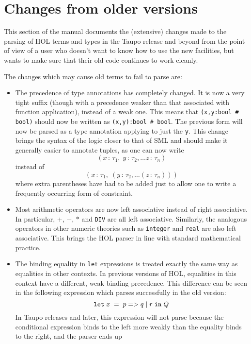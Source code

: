 \documentclass[12pt,fleqn,a4paper]{report}
\begin{document}
\section{Changes from older versions}

This section of the manual documents the (extensive) changes made to
the parsing of HOL terms and types in the Taupo release and beyond
from the point of view of a user who doesn't want to know how to use
the new facilities, but wants to make sure that their old code
continues to work cleanly.

The changes which may cause old terms to fail to parse are:
\begin{itemize}
\newcommand\condexp{\mbox{$p \; {\tt =>} \; q \; {\tt |} \; r$}}
\item The precedence of type annotations has completely changed.  It
  is now a very tight suffix (though with a precedence weaker than
  that associated with function application), instead of a weak one.
  This means that \mbox{\tt (x,y:bool \# bool)} should now be written
  as \mbox{\tt (x,y):bool \# bool}. The previous form will now be
  parsed as a type annotation applying to just the \verb+y+.  This
  change brings the syntax of the logic closer to that of SML and
  should make it generally easier to annotate tuples, as one can now
  write \[ (x\,:\,\tau_1,\;y\,:\,\tau_2,\dots z\,:\,\tau_n)
  \] instead of \[
  (x\,:\,\tau_1, \;(y\,:\,\tau_2, \dots (z\,:\,\tau_n)))
  \] where extra parentheses have had to be added just to allow one to
  write a frequently occurring form of constraint.
\item Most arithmetic operators are now left associative instead of
  right associative.  In particular, $+$, $-$, $*$ and {\tt DIV} are
  all left associative.  Similarly, the analogous operators in other
  numeric theories such as {\tt integer} and {\tt real} are also left
  associative.  This brings the HOL parser in line with standard
  mathematical practice.
\item The binding equality in {\tt let} expressions is treated exactly
  the same way as equalities in other contexts.  In previous versions
  of HOL, equalities in this context have a different, weak binding
  precedence.  This difference can be seen in the following expression
  which parses successfully in the old version:
  \[ {\tt let} \; x \; = \; \condexp \; {\tt
  in} \;Q \] In Taupo releases and later, this expression will not
  parse because the conditional expression binds to the left more
  weakly than the equality binds to the right, and the parser ends up

\end{itemize}
\end{document}
